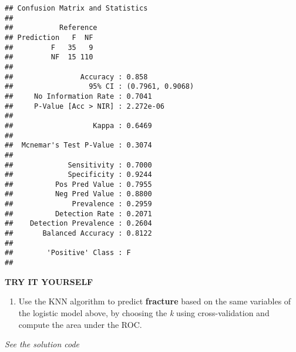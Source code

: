 \documentclass[
]{book}
\providecommand{\tightlist}{%
  \setlength{\itemsep}{0pt}\setlength{\parskip}{0pt}}
\begin{document}
\begin{verbatim}
## Confusion Matrix and Statistics
## 
##           Reference
## Prediction   F  NF
##         F   35   9
##         NF  15 110
##                                           
##                Accuracy : 0.858           
##                  95% CI : (0.7961, 0.9068)
##     No Information Rate : 0.7041          
##     P-Value [Acc > NIR] : 2.272e-06       
##                                           
##                   Kappa : 0.6469          
##                                           
##  Mcnemar's Test P-Value : 0.3074          
##                                           
##             Sensitivity : 0.7000          
##             Specificity : 0.9244          
##          Pos Pred Value : 0.7955          
##          Neg Pred Value : 0.8800          
##              Prevalence : 0.2959          
##          Detection Rate : 0.2071          
##    Detection Prevalence : 0.2604          
##       Balanced Accuracy : 0.8122          
##                                           
##        'Positive' Class : F               
## 
\end{verbatim}

\textbf{TRY IT YOURSELF}

\begin{enumerate}
\def\labelenumi{\arabic{enumi})}
\tightlist
\item
  Use the KNN algorithm to predict \textbf{fracture} based on the same variables
  of the logistic model above, by choosing the \emph{k} using cross-validation and
  compute the area under the ROC.
\end{enumerate}

\emph{See the solution code}
\end{document}

